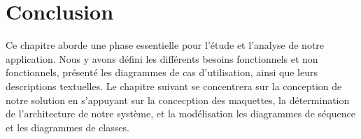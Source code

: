 \section*{Conclusion}
Ce chapitre aborde une phase essentielle pour l'étude et l'analyse 
de notre application. Nous y avons défini les différents besoins 
fonctionnels et non fonctionnels, présenté les diagrammes de cas 
d’utilisation, ainsi que leurs descriptions textuelles. Le chapitre 
suivant se concentrera sur la conception de notre solution en 
s'appuyant sur la concecption des maquettes, la détermination de 
l'architecture de notre système, et la modélisation les diagrammes de séquence et les diagrammes de 
classes.
